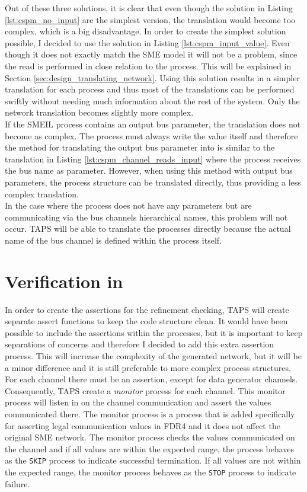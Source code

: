 Out of these three solutions, it is clear that even though the solution in Listing \ref{lst:cspm_no_input} are the simplest version, the translation would become too complex, which is a big disadvantage. In order to create the simplest solution possible, I decided to use the solution in Listing \ref{lst:cspm_input_value}. Even though it does not exactly match the SME model it will not be a problem, since the read is performed in close relation to the process. This will be explained in Section \ref{sec:design_translating_network}. Using this solution results in a simpler translation for each process and thus most of the translations can be performed swiftly without needing much information about the rest of the system. Only the network translation becomes slightly more complex.\\

If the SMEIL process contains an output bus parameter, the translation does not become as complex. The process must always write the value itself and therefore the method for translating the output bus parameter into \cspm{} is similar to the translation in Listing \ref{lst:cspm_channel_reads_input} where the process receives the bus name as parameter. However, when using this method with output bus parameters, the process structure can be translated directly, thus providing a less complex translation.\\

In the case where the process does not have any parameters but are communicating via the bus channels hierarchical names, this problem will not occur. TAPS will be able to translate the processes directly because the actual name of the bus channel is defined within the process itself.

\section{Verification in \cspm{}}
In order to create the assertions for the refinement checking, TAPS will create separate assert functions to keep the code structure clean. It would have been possible to include the assertions within the processes, but it is important to keep separations of concerns and therefore I decided to add this extra assertion process. This will increase the complexity of the generated \cspm{} network, but it will be a minor difference and it is still preferable to more complex process structures. For each \cspm{} channel there must be an assertion, except for data generator channels. Consequently, TAPS create a \textit{monitor} process for each channel. This monitor process will listen in on the channel communication and assert the values communicated there. The monitor process is a process that is added specifically for asserting legal communication values in FDR4 and it does not affect the original SME network. The monitor process checks the values communicated on the channel and if all values are within the expected range, the process behaves as the \texttt{SKIP} process to indicate successful termination. If all values are not within the expected range, the monitor process behaves as the \texttt{STOP} process to indicate failure. \\

